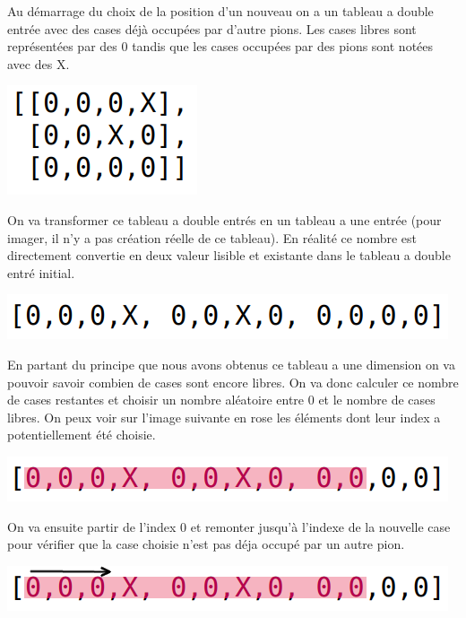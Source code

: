 Au démarrage du choix de la position d'un nouveau on a un tableau a double entrée avec des cases déjà occupées par d'autre pions. Les cases libres sont représentées par des 0 tandis que les cases occupées par des pions sont notées avec des X.

\begin{center}
\includegraphics[scale=0.75]{image/Plateau jeu normal.png}
\end{center}


On va transformer ce tableau a double entrés en un tableau a une entrée (pour imager, il n'y a pas création réelle de ce tableau). En réalité ce nombre est directement convertie en deux valeur lisible et existante dans le tableau a double entré initial.

\begin{center}
\includegraphics[width=\textwidth]{image/Plateau jeu en ligne.png}
\end{center}

En partant du principe que nous avons obtenus ce tableau a une dimension on va pouvoir savoir combien de cases sont encore libres. On va donc calculer ce nombre de cases restantes et choisir un nombre aléatoire entre 0 et le nombre de cases libres. On peux voir sur l'image suivante en rose les éléments dont leur index a potentiellement été choisie.

\begin{center}
\includegraphics[width=\textwidth]{image/Plateau jeu en ligne choix nombre.png}
\end{center}


On va ensuite partir de l'index 0 et remonter jusqu’à l'indexe de la nouvelle case pour vérifier que la case choisie n'est pas déja occupé par un autre pion.

\begin{center}
\includegraphics[width=\textwidth]{image/Plateau jeu en ligne choix nombre direction.png}
\end{center}


